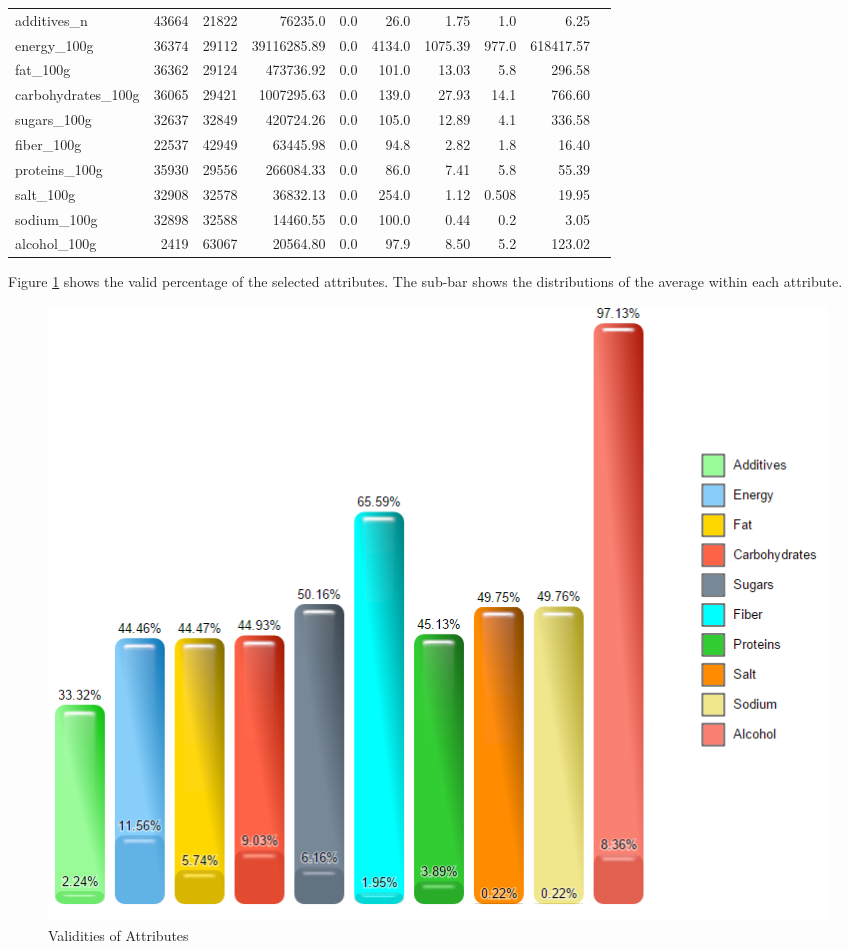 \documentclass[11pt]{article}
\begin{document}
\begin{center}
\begin{longtable}{|l|r|r|r|r|r|r|r|r|r|}
additives\_n & 43664 & 21822 & 76235.0 & 0.0 & 26.0 & 1.75 & 1.0 & 6.25 \\
energy\_100g & 36374 & 29112 & 39116285.89 & 0.0 & 4134.0 & 1075.39 & 977.0 & 618417.57 \\
fat\_100g & 36362 & 29124 & 473736.92 & 0.0 & 101.0 & 13.03 & 5.8 & 296.58 \\
carbohydrates\_100g & 36065 & 29421 & 1007295.63 & 0.0 & 139.0 & 27.93 & 14.1 & 766.60 \\
sugars\_100g & 32637 & 32849 & 420724.26 & 0.0 & 105.0 & 12.89 & 4.1 & 336.58 \\
fiber\_100g & 22537 & 42949 & 63445.98 & 0.0 & 94.8 & 2.82 & 1.8 & 16.40 \\
proteins\_100g & 35930 & 29556 & 266084.33 & 0.0 & 86.0 & 7.41 & 5.8 & 55.39 \\
salt\_100g & 32908 & 32578 & 36832.13 & 0.0 & 254.0 & 1.12 & 0.508 & 19.95 \\
sodium\_100g & 32898 & 32588 & 14460.55 & 0.0 & 100.0 & 0.44 & 0.2 & 3.05 \\
alcohol\_100g & 2419 & 63067 & 20564.80 & 0.0 & 97.9 & 8.50 & 5.2 & 123.02 \\

\hline

\end{longtable}
\end{center}

Figure \ref{fig:attributesValidityFigure} shows the valid percentage of the selected attributes. The sub-bar shows the distributions of the average within each attribute.

\begin{figure}[!htp]
\centering
\includegraphics[width=\textwidth]{../vis/selected.attributes.validity.png}
\caption{Validities of Attributes}
\label{fig:attributesValidityFigure}
\end{figure}
\end{document}
